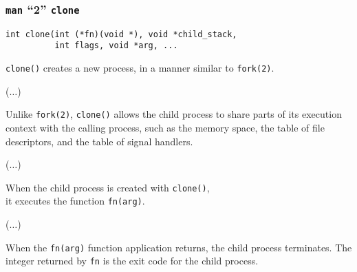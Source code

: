 \begin{frame}[fragile]

\frametitle{\texttt{man} ``2'' \texttt{clone}}

\footnotesize

\begin{manblock}

\begin{lstlisting}
int clone(int (*fn)(void *), void *child_stack,
          int flags, void *arg, ...
\end{lstlisting}

\texttt{clone()} creates a new process, in a manner similar to \texttt{fork(2)}.

\medskip

($\ldots$)

\medskip

Unlike \texttt{fork(2)}, \texttt{clone()} allows the child process to
share parts of its execution context with the calling process, such as the
memory space, the table of file descriptors, and the table of signal handlers.

($\ldots$)

\medskip

When the child process is created with \texttt{clone()}, \\ it  executes
the function \texttt{fn(arg)}.

($\ldots$)

\medskip

When the \texttt{fn(arg)} function application returns,  the  child process
terminates. The integer returned by \texttt{fn} is the exit code for the child
process.


\end{manblock}

\end{frame}
